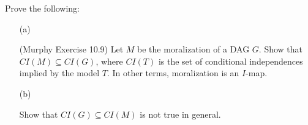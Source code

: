\documentclass{article}
\begin{document}
\begin{exercise}

Prove the following:

\begin{enumerate}

\item[(a)]

(Murphy Exercise 10.9) Let $M$ be the moralization of a DAG $G$. Show that $CI(M) \subseteq CI(G)$, where $CI(T)$ is the set of conditional independences implied by the model $T$. In other terms, moralization is an $I$-map.

\item[(b)]

Show that $CI(G) \subseteq CI(M)$ is not true in general. 

\end{enumerate}

\end{exercise}
\end{document}
